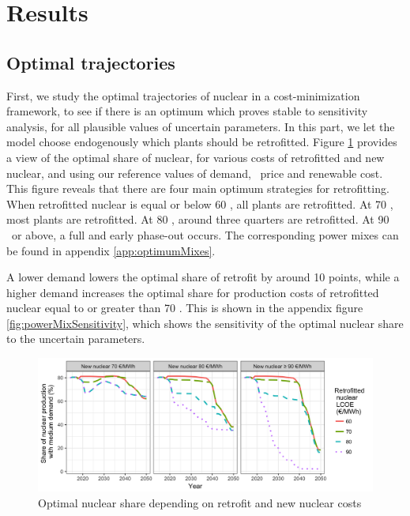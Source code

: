 





\section{Results}
\label{sec:results}

\subsection{Optimal trajectories}
\label{ssec:optimaltraj}
First, we study the optimal trajectories of nuclear in a cost-minimization framework, to see if there is an optimum which proves stable to sensitivity analysis, for all plausible values of uncertain parameters. In this part, we let the model choose endogenously which plants should be retrofitted.
Figure \ref{fig:nukeShare} provides a view of the optimal share of nuclear, for various costs of retrofitted and new nuclear, and using our reference values of demand, \coo\ price and renewable cost. This figure reveals that there are four main optimum strategies for retrofitting. When retrofitted nuclear is equal or below 60 \emwh, all plants are retrofitted. At 70 \emwh, most plants are retrofitted. At 80 \emwh, around three quarters are retrofitted. At 90 \emwh\ or above, a full and early phase-out occurs. The corresponding power mixes can be found in appendix \ref{app:optimumMixes}.

A lower demand lowers the optimal share of retrofit by around 10 points, while a higher demand increases the optimal share for production costs of retrofitted nuclear equal to or greater than 70 \emwh. This is shown in the appendix figure \ref{fig:powerMixSensitivity}, which shows the sensitivity of the optimal nuclear share to the uncertain parameters. 

\begin{figure}[!ht]
	\centering
	\includegraphics[width=12cm]{figures/nukeShare2_MedD.png}
	\caption{Optimal nuclear share depending on retrofit and new nuclear costs}
	\label{fig:nukeShare}
\end{figure}

